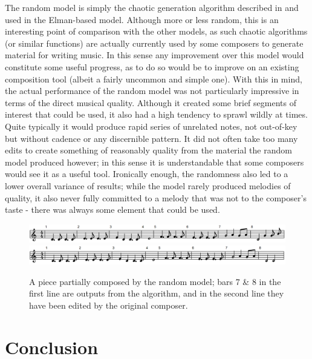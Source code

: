 \documentclass[ author={Stephen Livermore-Tozer},
				supervisor={Dr. Peter Flach},
				degree={MEng},
				title={Algorithmic Co-composition Using Machine Learning},
				subtitle={},
				type={research},
				year={2016} ]{dissertation}
\begin{document}
	The random model is simply the chaotic generation algorithm described in \cite{coca2010characterizing} and used in the Elman-based model. Although more or less random, this is an interesting point of comparison with the other models, as such chaotic algorithms (or similar functions) are actually currently used by some composers to generate material for writing music. In this sense any improvement over this model would constitute some useful progress, as to do so would be to improve on an existing composition tool (albeit a fairly uncommon and simple one). With this in mind, the actual performance of the random model was not particularly impressive in terms of the direct musical quality. Although it created some brief segments of interest that could be used, it also had a high tendency to sprawl wildly at times. Quite typically it would produce rapid series of unrelated notes, not out-of-key but without cadence or any discernible pattern. It did not often take too many edits to create something of reasonably quality from the material the random model produced however; in this sense it is understandable that some composers would see it as a useful tool. Ironically enough, the randomness also led to a lower overall variance of results; while the model rarely produced melodies of quality, it also never fully committed to a melody that was not to the composer's taste - there was always some element that could be used. 
	
	\begin{figure}[h]
		\centering
		\includegraphics[width=1.0\textwidth]{random-unedited-example}
		\includegraphics[width=1.0\textwidth]{random-edited-example}
		\caption{A piece partially composed by the random model; bars 7 \& 8 in the first line are outputs from the algorithm, and in the second line they have been edited by the original composer.}
	\end{figure}

	
	\chapter{Conclusion}
	\label{chap:conclusion}
	
\end{document}
